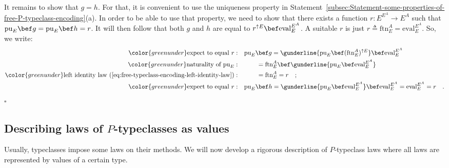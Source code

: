 It remains to show that $g=h$. For that, it is convenient to use
the uniqueness property in Statement~\ref{subsec:Statement-some-properties-of-free-P-typeclass-encoding}(a).
In order to be able to use that property, we need to show that there
exists a function $r:E^{E^{A}}\rightarrow E^{A}$ such that $\text{pu}_{E}\bef g=\text{pu}_{E}\bef h=r$.
It will then follow that both $g$ and $h$ are equal to $r^{\uparrow E}\bef\text{eval}_{E}^{E^{A}}$.
A suitable $r$ is just $r\triangleq\text{ftn}_{E}^{A}=\text{eval}_{E}^{E^{A}}$.
So, we write:
\begin{align*}
{\color{greenunder}\text{expect to equal }r:}\quad & \text{pu}_{E}\bef g=\gunderline{\text{pu}_{E}\bef(\text{ftn}_{E}^{A})^{\uparrow E}}\bef\text{eval}_{E}^{E^{A}}\\
{\color{greenunder}\text{naturality of }\text{pu}_{E}:}\quad & \quad\quad=\text{ftn}_{E}^{A}\bef\gunderline{\text{pu}_{E}\bef\text{eval}_{E}^{E^{A}}}\\
{\color{greenunder}\text{left identity law~(\ref{eq:free-typeclass-encoding-left-identity-law})}:}\quad & \quad\quad=\text{ftn}_{E}^{A}=r\quad;\\
{\color{greenunder}\text{expect to equal }r:}\quad & \text{pu}_{E}\bef h=\gunderline{\text{pu}_{E}\bef\text{eval}_{E}^{E^{A}}}\bef\text{eval}_{E}^{E^{A}}=\text{eval}_{E}^{E^{A}}=r\quad.
\end{align*}
$\square$

\subsection{Describing laws of $P$-typeclasses as values\label{subsec:Describing-laws-of-P-typeclasses-as-values}}

Usually, typeclasses impose some laws on their methods. We will now
develop a rigorous description of $P$-typeclass laws where all laws
are represented by values of a certain type.

